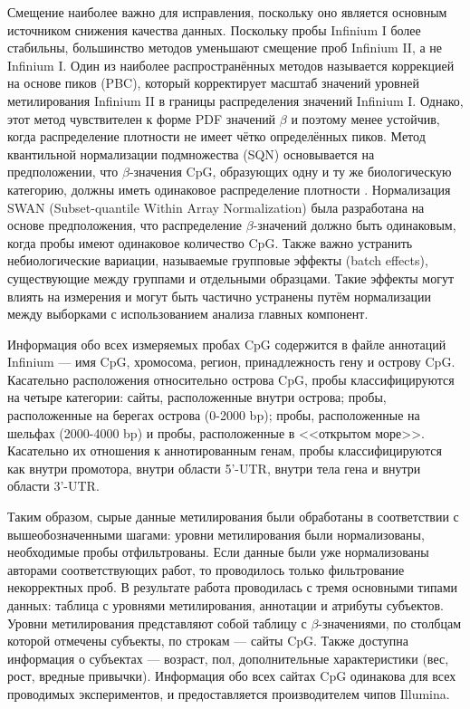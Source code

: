 Смещение наиболее важно для исправления, поскольку оно является основным источником снижения качества данных. Поскольку пробы Infinium I более стабильны, большинство методов уменьшают смещение проб Infinium II, а не Infinium I. Один из наиболее распространённых методов называется коррекцией на основе пиков (PBC), который корректирует масштаб значений уровней метилирования Infinium II в границы распределения значений Infinium I. Однако, этот метод чувствителен к форме PDF значений $\beta$ и поэтому менее устойчив, когда распределение плотности не имеет чётко определённых пиков. Метод квантильной нормализации подмножества (SQN) основывается на предположении, что $\beta$-значения CpG, образующих одну и ту же биологическую категорию, должны иметь одинаковое распределение плотности \autocite{Touleimat2012}. Нормализация SWAN (Subset-quantile Within Array Normalization) \autocite{Maksimovic2012} была разработана на основе предположения, что распределение $\beta$-значений должно быть одинаковым, когда пробы имеют одинаковое количество CpG. Также важно устранить небиологические вариации, называемые групповые эффекты (batch effects), существующие между группами и отдельными образцами. Такие эффекты могут влиять на измерения и могут быть частично устранены путём нормализации между выборками с использованием анализа главных компонент.

Информация обо всех измеряемых пробах CpG содержится в файле аннотаций Infinium --- имя CpG, хромосома, регион, принадлежность гену и острову CpG. Касательно расположения относительно острова CpG, пробы классифицируются на четыре категории: сайты, расположенные внутри острова; пробы, расположенные на берегах острова (0-2000 bp); пробы, расположенные на шельфах (2000-4000 bp) и пробы, расположенные в <<открытом море>>. Касательно их отношения к аннотированным генам, пробы классифицируются как внутри промотора, внутри области 5'-UTR, внутри тела гена и внутри области 3'-UTR. 

Таким образом, сырые данные метилирования были обработаны в соответствии с вышеобозначенными шагами: уровни метилирования были нормализованы, необходимые пробы отфильтрованы. Если данные были уже нормализованы авторами соответствующих работ, то проводилось только фильтрование некорректных проб. В результате работа проводилась с тремя основными типами данных: таблица с уровнями метилирования, аннотации и атрибуты субъектов. Уровни метилирования представляют собой таблицу с $\beta$-значениями, по столбцам которой отмечены субъекты, по строкам --- сайты CpG. Также доступна информация о субъектах --- возраст, пол, дополнительные характеристики (вес, рост, вредные привычки). Информация обо всех сайтах CpG одинакова для всех проводимых экспериментов, и предоставляется производителем чипов Illumina.

